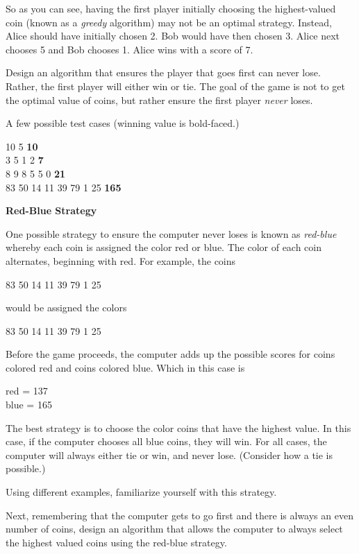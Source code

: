 \documentclass[11pt]{article}
\begin{document}
So as you can see, having the first player initially choosing the highest-valued coin (known as a {\it greedy} algorithm) may not be an optimal strategy.  Instead, Alice should have initially chosen 2. Bob would have then chosen 3. Alice next chooses 5 and Bob chooses 1. Alice wins with a score of 7.

Design an algorithm that ensures the player that goes first can never lose. Rather, the first player will either win or tie. The goal of the game is not to get the optimal value of coins, but rather ensure the first player {\it never} loses. 

A few possible test cases (winning value is bold-faced.) 

10 5 {\bf 10} \\
3 5 1 2 {\bf 7} \\
8 9 8 5 5 0 {\bf 21} \\
83 50 14 11 39 79 1 25 {\bf 165}

\newpage

{\large {\bf Red-Blue Strategy}} 

One possible strategy to ensure the computer never loses is known  as {\it red-blue} whereby each coin is assigned the color {\color{red}red} or {\color{blue}blue}. The color of each coin alternates, beginning with {\color{red}red}. For example, the coins 

83 50 14 11 39 79 1 25

would be assigned the colors

{\color{red}83} {\color{blue}50} {\color{red}14} {\color{blue}11} {\color{red}39} {\color{blue}79} {\color{red}1} {\color{blue}25}

Before the game proceeds, the computer adds up the possible scores for coins colored red and coins colored blue. Which in this case is

{\color{red}red = 137} \\
{\color{blue}blue = 165}

The best strategy is to choose the color coins that have the highest value. In this case, if the computer chooses all blue coins, they will win. For all cases, the computer will always either tie or win, and never lose. (Consider how a tie is possible.)

Using different examples, familiarize yourself with this strategy.

Next, remembering that the computer gets to go first and there is always an even number of coins, design an algorithm that allows the computer to always select the highest valued coins using the red-blue strategy.


 
\end{document}
